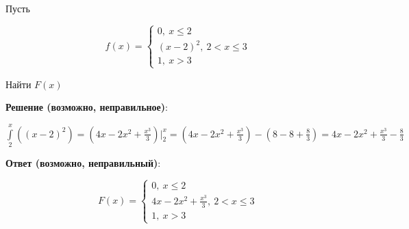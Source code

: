 \documentclass{article}
\begin{document}
Пусть

$$f(x) = \begin{cases}
    0, \ x \le 2 \\
    (x-2)^2, \ 2 < x \le 3 \\
    1, \ x > 3
\end{cases}$$

Найти $F(x)$

\textbf{Решение (возможно, неправильное)}:

$\int\limits^{x}_{2} ((x-2)^2) = (4 x - 2 x^2 + \frac{x^3}{3}) \bigg|^{x}_{2} = (4x - 2x^2 + \frac{x^3}{3}) - (8 - 8 + \frac{8}{3}) = 4x - 2x^2 + \frac{x^3}{3} - \frac{8}{3}$

\textbf{Ответ (возможно, неправильный)}:

$$F(x) = \begin{cases}
    0, \ x \le 2 \\
    4x - 2x^2 + \frac{x^3}{3}, \ 2 < x \le 3 \\
    1, \ x > 3
\end{cases}$$
\end{document}
